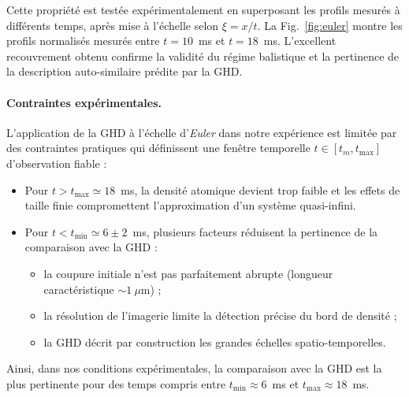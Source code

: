 \medskip

Cette propriété est testée expérimentalement en superposant les profils mesurés à différents temps, après mise à l’échelle selon $\xi = x/t$. La Fig.~\ref{fig:euler} montre les profils normalisés mesurés entre $t = 10$~ms et $t = 18$~ms. L’excellent recouvrement obtenu confirme la validité du régime balistique et la pertinence de la description auto-similaire prédite par la \gls{GHD}.

\paragraph{Contraintes expérimentales.}

L’application de la \gls{GHD} à l’échelle d’\emph{Euler} dans notre expérience est limitée par des contraintes pratiques qui définissent une fenêtre temporelle $t \in [t_m, t_{\mathrm{max}}]$ d’observation fiable : 

\begin{itemize}[label = $\bullet$]
  \item Pour $t > t_{\mathrm{max}} \simeq 18$~ms, la densité atomique devient trop faible et les effets de taille finie compromettent l’approximation d’un système quasi-infini.
  \item Pour $t < t_{\mathrm{min}} \simeq 6 \pm 2$~ms, plusieurs facteurs réduisent la pertinence de la comparaison avec la \gls{GHD} :
  \begin{itemize}[label = $\circ$]
    \item la coupure initiale n’est pas parfaitement abrupte (longueur caractéristique $\sim 1~\mu$m) ;
    \item la résolution de l’imagerie limite la détection précise du bord de densité ;
    \item la \gls{GHD} décrit par construction les grandes échelles spatio-temporelles.
  \end{itemize}
\end{itemize}

Ainsi, dans nos conditions expérimentales, la comparaison avec la \gls{GHD} est la plus pertinente pour des temps compris entre $t_{\mathrm{min}} \approx 6$~ms et $t_{\mathrm{max}} \approx 18$~ms.

%
%

